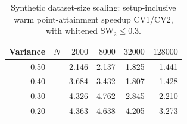 \begin{table}[tb]
\centering\small
\caption{Synthetic dataset-size scaling: setup-inclusive warm point-attainment speedup CV1/CV2, with whitened SW$_2\leq0.3$.}\label{tab:n_scaling}
\begin{tabular}{rrrrr}
\toprule
Variance & $N=2000$ & $8000$ & $32000$ & $128000$ \\
\midrule
0.50 & 2.146 & 2.137 & 1.825 & 1.441 \\
0.40 & 3.684 & 3.432 & 1.807 & 1.428 \\
0.30 & 4.326 & 4.762 & 2.845 & 2.210 \\
0.20 & 4.363 & 4.638 & 4.205 & 3.273 \\
\bottomrule
\end{tabular}
\par{}
\end{table}
